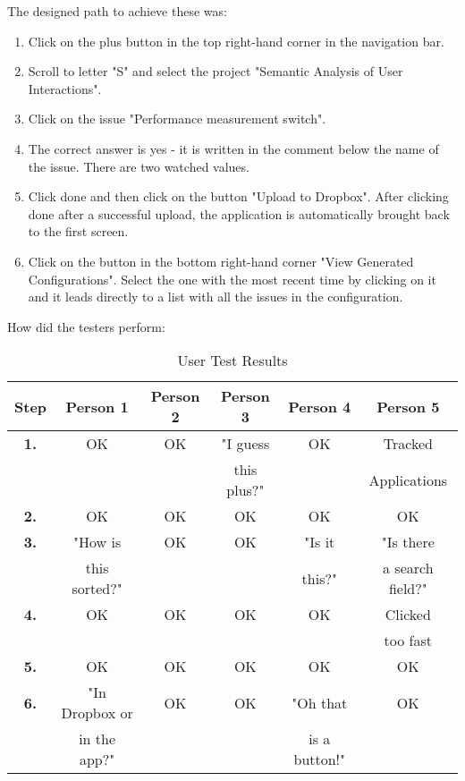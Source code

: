 The designed path to achieve these was:

\begin{enumerate}
	\item Click on the plus button in the top right-hand corner in the navigation bar.
	\item Scroll to letter "S" and select the project "Semantic Analysis of User Interactions".
	\item Click on the issue "Performance measurement switch".
	\item The correct answer is yes - it is written in the comment below the name of the issue. There are two watched values.
	\item Click done and then click on the button "Upload to Dropbox". After clicking done after a successful upload, the application is automatically brought back to the first screen.
	\item Click on the button in the bottom right-hand corner "View Generated Configurations". Select the one with the most recent time by clicking on it and it leads directly to a list with all the issues in the configuration.
\end{enumerate}

\newpage

How did the testers perform:

\begin{table}[!ht]
\begin{center}
\begin{tabular}{|c|c|c|c|c|c|}
\hline
\textbf{Step} & \textbf{Person 1} & \textbf{Person 2} & \textbf{Person 3} & \textbf{Person 4} & \textbf{Person 5} \\
\hline
\textbf{1.} & OK & OK & "I guess & OK & Tracked  \\
& & & this plus?" & & Applications \\
\hline
\textbf{2.} & OK & OK & OK & OK & OK \\
\hline
\textbf{3.} & "How is  & OK & OK & "Is it & "Is there \\
& this sorted?" & & & this?" & a search field?" \\
\hline
\textbf{4.} & OK & OK & OK & OK & Clicked \\
& & & & & too fast \\
\hline
\textbf{5.} & OK & OK & OK & OK & OK \\
\hline
\textbf{6.} & "In Dropbox or & OK & OK & "Oh that & OK \\
& in the app?" & & & is a button!" & \\
\hline
\end{tabular}
\end{center}
\caption{User Test Results}
\label{tab:scenario}
\end{table}

